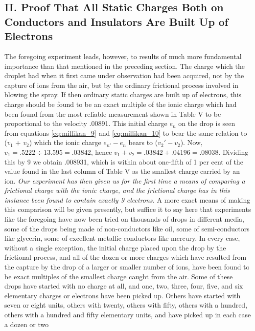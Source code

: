 \subsection*{II. Proof That All Static Charges Both on Conductors and Insulators Are
Built Up of Electrons}

The foregoing experiment leads, however, to results of much more
fundamental im\-por\-tance than that mentioned in the preceding section. The
charge which the droplet had when it first came under observation had
been acquired, not by the capture of ions from the air, but by the
ordinary frictional process involved in blowing the spray. If then
ordinary static charges are built up of electrons, this charge should be
found to be an exact multiple of the ionic charge which had been found
from the most reliable measurement shown in Table V to be proportional
to the velocity .00891. This initial charge $e_n$ on the drop is
seen from equations \eqref{eq:millikan_9} and \eqref{eq:millikan_10} to bear the same relation to ($v_1$
+ $v_2$) which the ionic charge $e_{n'} - e_n$ bears to
($v_{2}' - v_2$). Now, $v_1 = .5222\div13.595 = .03842$, hence
$v_1 + v_2 = .03842 + .04196 = .08038$. Dividing this by 9 we
obtain .008931, which is within about one-fifth of 1 per cent of the
value found in the last column of Table V as the smallest charge carried
by an ion. \emph{Our experiment has then given us for the first time a
means of comparing a frictional charge with the ionic charge, and the
frictional charge has in this instance been found to contain exactly 9
electrons.} A more exact means of making this comparison will be given
presently, but suffice it to say here that experiments like the
foregoing have now been tried on thousands of drops in different media,
some of the drops being made of non-conductors like oil, some of
semi-conductors like glycerin, some of excellent metallic conductors
like mercury. In every case, without a single exception, the initial
charge placed upon the drop by the frictional process, and all of the
dozen or more charges which have resulted from the capture by the drop
of a larger or smaller number of ions, have been found to be exact
multiples of the smallest charge caught from the air. Some of these
drops have started with no charge at all, and one, two, three, four,
five, and six elementary charges or electrons have been picked up.
Others have started with seven or eight units, others with twenty,
others with fifty, others with a hundred, others with a hundred and
fifty elementary units, and have picked up in each case a dozen or two
